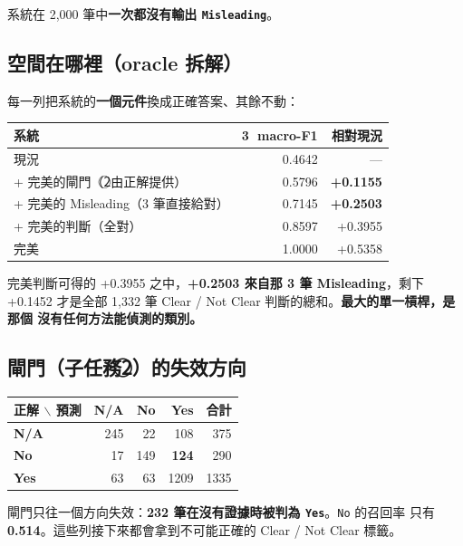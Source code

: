 \documentclass[11pt,a4paper]{ctexart}
\newcommand{\fn}[1]{\texttt{#1}}
\begin{document}
系統在 2{,}000 筆中\textbf{一次都沒有輸出 \fn{Misleading}}。

\subsection{空間在哪裡（oracle 拆解）}
\label{sec:headroom}

每一列把系統的\textbf{一個元件}換成正確答案、其餘不動：

\begin{table}[h]
\centering\small
\begin{tabular}{@{}lrr@{}}
\toprule
系統 & \textcircled{3} macro-F1 & 相對現況 \\
\midrule
現況 & 0.4642 & --- \\
+ 完美的閘門（\textcircled{2}由正解提供） & 0.5796 & \textbf{+0.1155} \\
+ 完美的 Misleading（3 筆直接給對） & 0.7145 & \textbf{+0.2503} \\
+ 完美的判斷（全對） & 0.8597 & +0.3955 \\
完美 & 1.0000 & +0.5358 \\
\bottomrule
\end{tabular}
\end{table}

完美判斷可得的 +0.3955 之中，\textbf{+0.2503 來自那 3 筆 Misleading}，剩下 +0.1452
才是全部 1{,}332 筆 Clear / Not Clear 判斷的總和。\textbf{最大的單一槓桿，是那個
沒有任何方法能偵測的類別。}

\subsection{閘門（子任務\textcircled{2}）的失效方向}

\begin{table}[h]
\centering\small
\begin{tabular}{@{}lrrrr@{}}
\toprule
正解 $\backslash$ 預測 & N/A & No & Yes & 合計 \\
\midrule
\textbf{N/A} & 245 & 22  & 108 & 375 \\
\textbf{No}  & 17  & 149 & \textbf{124} & 290 \\
\textbf{Yes} & 63  & 63  & 1209 & 1335 \\
\bottomrule
\end{tabular}
\end{table}

閘門只往一個方向失效：\textbf{232 筆在沒有證據時被判為 \fn{Yes}}。\fn{No} 的召回率
只有 \textbf{0.514}。這些列接下來都會拿到不可能正確的 Clear / Not Clear 標籤。
\end{document}
